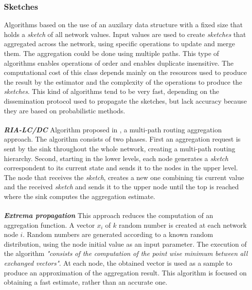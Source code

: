 \subsubsection{Sketches}
Algorithms based on the use of an auxilary data structure with a fixed size that holds a \textit{sketch} of all network values. Input values are used to create \textit{sketches} that aggregated across the network, using specific operations to update and merge them. The aggregation could be done using multiple paths. This type of algorithms enables operations of order and enables duplicate insensitive. The computational cost of this class depends mainly on the resources used to produce the result by the estimator and the complexity of the operations to produce the \textit{sketches}. This kind of algorithms tend to be very fast, depending on the dissemination protocol used to propagate the sketches, but lack accuracy because they are based on probabilistic methods.\\
\\
\textbf{\textit{RIA-LC/DC}} Algorithm proposed in \cite{fan2008efficient}, a multi-path routing aggregation approach. The algorithm consists of two phases. First an aggregation request is sent by the sink throughout the whole network, creating a multi-path routing hierarchy. Second, starting in the lower levels, each node generates a \textit{sketch} correspondent to its current state and sends it to the nodes in the upper level. The node that receives the \textit{sketch}, creates a new one combining tis current value and the received \textit{sketch} and sends it to the upper node until the top is reached where the sink computes the aggregation estimate.\\
\\
\textbf{\textit{Extrema propagation}}
This approach reduces the computation of an aggregation function\cite{journals/corr/abs-1110-0725}. A vector $x_i$ of $k$ random number is created at each network node $i$. Random numbers are generated according to a known random distribution, using the node initial value as an input parameter. The execution of the algorithm \textit{"consists of the computation of the point wise minimum between all exchanged vectors"}\cite{journals/corr/abs-1110-0725}. At each node, the obtained vector is used as a sample to produce an approximation of the aggregation result. This algorithm is focused on obtaining a fast estimate, rather than an accurate one. 
